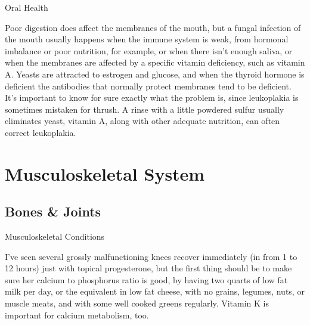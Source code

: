 \documentclass[11pt,oneside,openany,extrafontsizes]{memoir}
\begin{document}
\begin{standalonequote}{Oral Health}

    \begin{answer}
        Poor digestion does affect the membranes of the mouth, but a fungal infection of the mouth usually happens when the immune system is weak, from hormonal imbalance or poor nutrition, for example, or when there isn't enough saliva, or when the membranes are affected by a specific vitamin deficiency, such as vitamin A. Yeasts are attracted to estrogen and glucose, and when the thyroid hormone is deficient the antibodies that normally protect membranes tend to be deficient. It's important to know for sure exactly what the problem is, since leukoplakia is sometimes mistaken for thrush. A rinse with a little powdered sulfur usually eliminates yeast, vitamin A, along with other adequate nutrition, can often correct leukoplakia.
    \end{answer}
\end{standalonequote}

\section{Musculoskeletal System}
\subsection{Bones \& Joints}

\begin{standalonequote}{Musculoskeletal Conditions}

    \begin{answer}
        I've seen several grossly malfunctioning knees recover immediately (in from 1 to 12 hours) just with topical progesterone, but the first thing should be to make sure her calcium to phosphorus ratio is good, by having two quarts of low fat milk per day, or the equivalent in low fat cheese, with no grains, legumes, nuts, or muscle meats, and with some well cooked greens regularly. Vitamin K is important for calcium metabolism, too.
    \end{answer}
\end{standalonequote}
\end{document}
